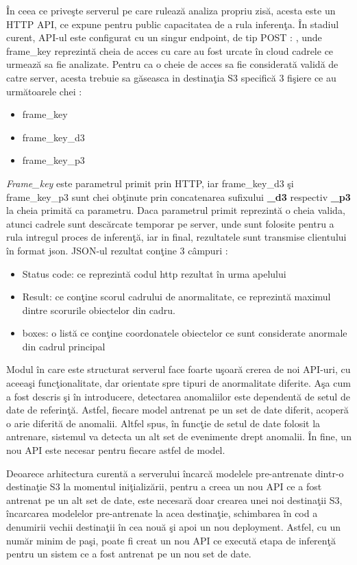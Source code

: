 \documentclass[a4paper,12pt]{report}
\begin{document}
\par
În ceea ce priveşte serverul pe care rulează analiza propriu zisă, acesta este un HTTP API, ce expune pentru public capacitatea de a rula inferenţa. În stadiul curent, API-ul este configurat cu un singur endpoint, de tip POST  :  , unde frame\_key reprezintă cheia de acces cu care au fost urcate în cloud cadrele ce urmează sa fie analizate. Pentru ca o cheie de acces sa fie considerată validă de catre server, acesta trebuie sa găseasca in destinaţia S3 specifică 3 fişiere ce au următoarele chei :
\begin{itemize}
\item frame\_key
\item frame\_key\_d3
\item frame\_key\_p3
\end{itemize}
\par \emph{Frame\_key} este parametrul primit prin HTTP,  iar frame\_key\_d3 şi frame\_key\_p3 sunt chei obţinute prin concatenarea sufixului \textbf{\_d3} respectiv \textbf{\_p3} la cheia primită ca parametru. Daca parametrul primit reprezintă o cheia valida, atunci cadrele sunt descărcate temporar pe server, unde sunt folosite pentru a rula intregul proces de inferenţă, iar in final, rezultatele sunt transmise clientului în format json. 
JSON-ul rezultat conţine 3 câmpuri : 
\begin{itemize}
\item Status code: ce reprezintă codul http rezultat în urma apelului
\item Result: ce conţine scorul cadrului de anormalitate, ce reprezintă maximul dintre scorurile obiectelor din cadru.
\item boxes: o listă ce conţine coordonatele obiectelor ce sunt considerate anormale din cadrul principal
\end{itemize}
\par Modul în care este structurat serverul face foarte uşoară crerea de noi API-uri, cu aceeaşi funcţionalitate, dar orientate spre tipuri de anormalitate diferite. Aşa cum a fost descris şi în introducere, detectarea anomaliilor este dependentă de setul de date de referinţă. Astfel, fiecare model antrenat pe un set de date diferit, acoperă o arie diferită de anomalii. Altfel spus, în funcţie de setul de date folosit la antrenare, sistemul va detecta un alt set de evenimente drept anomalii. În fine, un nou API este necesar pentru fiecare astfel de model. 
\par Deoarece arhitectura curentă a serverului încarcă modelele pre-antrenate dintr-o destinaţie S3 la momentul iniţializării, pentru a creea un nou API ce a fost antrenat pe un alt set de date, este necesară doar crearea unei noi destinaţii S3, încarcarea modelelor pre-antrenate la acea destinaţie, schimbarea în cod a denumirii vechii destinaţii în cea nouă şi apoi un nou deployment. Astfel, cu un număr minim de paşi, poate fi creat un nou API ce execută etapa de inferenţă pentru un sistem ce a fost antrenat pe un nou set de date.
\end{document}
